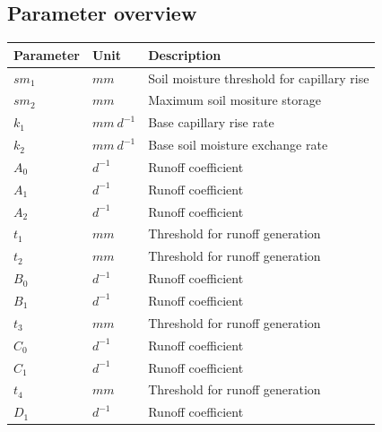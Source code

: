 \newpage
\subsection{Parameter overview}
\begin{table}[htbp]
  \centering
    \begin{tabular}{lll}
    \toprule
    Parameter & Unit  & Description \\
    \midrule
    $sm_1$ & $mm$  & Soil moisture threshold for capillary rise \\
    $sm_2$ & $mm$  & Maximum soil mositure storage \\
    $k_1$ & $mm~d^{-1}$ & Base capillary rise rate \\
    $k_2$ & $mm~d^{-1}$ & Base soil moisture exchange rate \\
    $A_0$ & $d^{-1}$ & Runoff coefficient \\
    $A_1$ & $d^{-1}$ & Runoff coefficient \\
    $A_2$ & $d^{-1}$ & Runoff coefficient \\
    $t_1$ & $mm$  & Threshold for runoff generation \\
    $t_2$ & $mm$  & Threshold for runoff generation \\
    $B_0$ & $d^{-1}$ & Runoff coefficient \\
    $B_1$ & $d^{-1}$ & Runoff coefficient \\
    $t_3$ & $mm$  & Threshold for runoff generation \\
    $C_0$ & $d^{-1}$ & Runoff coefficient \\
    $C_1$ & $d^{-1}$ & Runoff coefficient \\
    $t_4$ & $mm$  & Threshold for runoff generation \\
    $D_1$ & $d^{-1}$ & Runoff coefficient \\
    \bottomrule
    \end{tabular}%
  \label{tab:addlabel}%
\end{table}%
